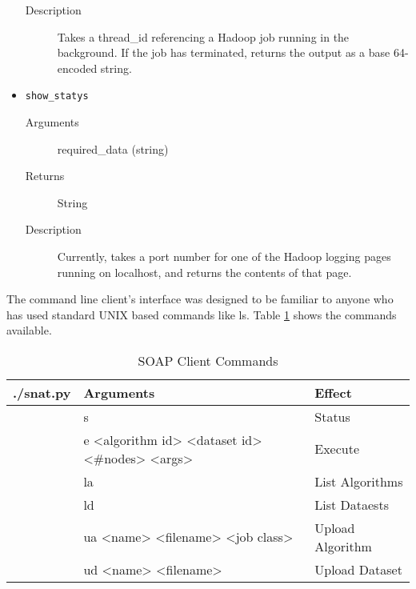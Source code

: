 \begin{itemize}
\begin{description}
        \item[Description] Takes a thread\_id referencing a Hadoop job running
in the background. If the job has terminated, returns the output as a base
64-encoded string.
    \end{description}
    
    \item {\tt show\_statys}

    \begin{description}        
        \item[Arguments] required\_data (string)
        
        \item[Returns] String
        
        \item[Description] Currently, takes a port number for one of the Hadoop
logging pages running on localhost, and returns the contents of that page.
    \end{description}
\end{itemize}

The command line client's interface was designed to be familiar to anyone who has used standard UNIX based commands like ls. Table \ref{tab:soapclient} shows the commands available.

\begin{table}[htbp]%
\begin{tabular}{l|l|l}
./snat.py & Arguments & Effect \\
\hline
 & s & Status \\
 & e <algorithm id> <dataset id> <\#nodes> <args> & Execute \\
 & la & List Algorithms \\
 & ld & List Dataests \\
 & ua <name> <filename> <job class> & Upload Algorithm \\
 & ud <name> <filename> & Upload Dataset \\
\end{tabular}
\caption{SOAP Client Commands}
\label{tab:soapclient}
\end{table}

